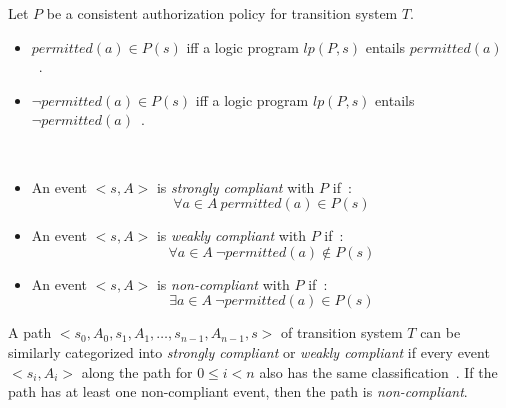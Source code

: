 \begin{definition}
    Let $P$ be a consistent authorization policy for transition system $T$.

    \begin{itemize}
        \item $permitted(a) \in P(s)$ iff a logic program $lp(P, s)$ entails $permitted(a)$~\citep{gelfond_authorization_2008}.
        \item $\neg permitted(a) \in P(s)$ iff a logic program $lp(P, s)$ entails $\neg permitted(a)$~\citep{gelfond_authorization_2008}.
    \end{itemize}
\end{definition}

\begin{definition}
    \label{def:authorization_event_compliance}
    ~

    \begin{itemize}
        \item An event $<s, A>$ is \textit{strongly compliant} with $P$ if~\citep{gelfond_authorization_2008}:
            \begin{equation}
                \forall a \in A\ permitted(a) \in P(s)
            \end{equation}
        \item An event $<s, A>$ is \textit{weakly compliant} with $P$ if~\citep{gelfond_authorization_2008}:
            \begin{equation}
                \forall a \in A\ \neg permitted(a) \not \in P(s)
            \end{equation}
        \item An event $<s, A>$ is \textit{non-compliant} with $P$ if~\citep{gelfond_authorization_2008}:
            \begin{equation}
                \exists a \in A\ \neg permitted(a) \in P(s)
            \end{equation}
    \end{itemize}
\end{definition}

\begin{definition}
    \label{def:authorization_path_compliance}
    A path $<s_0, A_0, s_1, A_1, \dots, s_{n-1}, A_{n-1}, s>$ of transition system $T$ can be similarly categorized into \textit{strongly compliant} or \textit{weakly compliant} if every event $<s_i, A_i>$ along the path for $0 \le i < n$ also has the same classification~\citep{gelfond_authorization_2008}.
    If the path has at least one non-compliant event, then the path is \textit{non-compliant}.
\end{definition}

